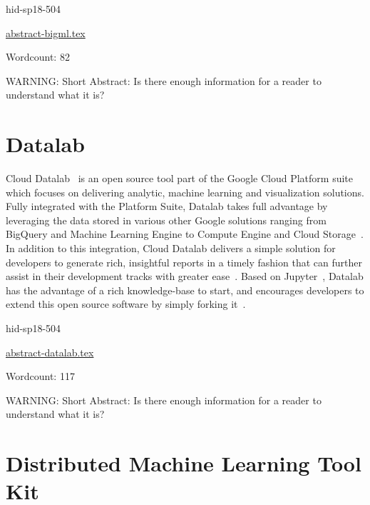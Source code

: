 \begin{IU}

hid-sp18-504

\href{https://github.com/cloudmesh-community/hid-sp18-504/blob/master//technology/abstract-bigml.tex}{abstract-bigml.tex}

 

Wordcount: 82

WARNING: Short Abstract: Is there enough information for a reader to understand what it is?

\end{IU}

\section{Datalab}

Cloud Datalab~\cite{hid-sp18-504-google-datalab} is an open source tool 
part of the Google Cloud Platform suite which focuses on delivering analytic, 
machine learning and visualization solutions. Fully integrated with the 
Platform Suite, Datalab takes full advantage by leveraging the data stored 
in various other Google solutions ranging from BigQuery and Machine Learning 
Engine to Compute Engine and Cloud Storage~\cite{hid-sp18-504-google-datalab}. 
In addition to this integration, Cloud Datalab delivers a simple solution for 
developers to generate rich, insightful reports in a timely fashion that can 
further assist in their development tracks with greater
ease~\cite{hid-sp18-504-techcrunch-datalab}.  
Based on Jupyter~\cite{hid-sp18-504-google-datalab}, Datalab has the 
advantage of a rich knowledge-base to start, and encourages developers 
to extend this open source software by simply 
forking it~\cite{hid-sp18-504-techcrunch-datalab}.


\begin{IU}

hid-sp18-504

\href{https://github.com/cloudmesh-community/hid-sp18-504/blob/master//technology/abstract-datalab.tex}{abstract-datalab.tex}

 

Wordcount: 117

WARNING: Short Abstract: Is there enough information for a reader to understand what it is?

\end{IU}

\section{Distributed Machine Learning Tool Kit}

